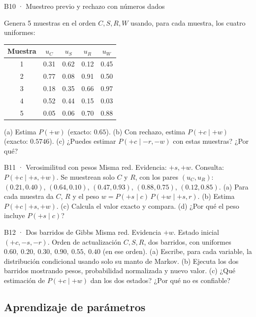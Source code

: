 \begin{ejercicio}{B10 · Muestreo previo y rechazo con números dados }
\begin{center}\figAsp\qquad\tabAsp\end{center}
Genera 5 muestras en el orden $C,S,R,W$ usando, para cada muestra, los cuatro uniformes:
\begin{center}\small
\begin{tabular}{c|cccc}
Muestra & $u_C$ & $u_S$ & $u_R$ & $u_W$\\\hline
1 & 0.31 & 0.62 & 0.12 & 0.45\\
2 & 0.77 & 0.08 & 0.91 & 0.50\\
3 & 0.18 & 0.35 & 0.66 & 0.97\\
4 & 0.52 & 0.44 & 0.15 & 0.03\\
5 & 0.05 & 0.06 & 0.70 & 0.88
\end{tabular}
\end{center}
(a) Estima $P(+w)$ (exacto: $0.65$). (b) Con rechazo, estima $P(+c\mid+w)$ (exacto: $0.5746$).
(c) ¿Puedes estimar $P(+c\mid-r,-w)$ con estas muestras? ¿Por qué?
\end{ejercicio}

\begin{ejercicio}{B11 · Verosimilitud con pesos }
Misma red. Evidencia: $+s,+w$. Consulta: $P(+c\mid+s,+w)$. Se muestrean solo $C$ y $R$, con los pares
$(u_C,u_R)$: $(0.21,0.40)$, $(0.64,0.10)$, $(0.47,0.93)$, $(0.88,0.75)$, $(0.12,0.85)$.
(a) Para cada muestra da $C$, $R$ y el peso $w=P(+s\mid c)\,P(+w\mid+s,r)$.
(b) Estima $P(+c\mid+s,+w)$. (c) Calcula el valor exacto y compara. (d) ¿Por qué el peso incluye $P(+s\mid c)$?
\end{ejercicio}

\begin{ejercicio}{B12 · Dos barridos de Gibbs }
Misma red. Evidencia $+w$. Estado inicial $(+c,-s,-r)$. Orden de actualización $C,S,R$, dos barridos, con uniformes
$0.60,\ 0.20,\ 0.30,\ 0.90,\ 0.55,\ 0.40$ (en ese orden).
(a) Escribe, para cada variable, la distribución condicional usando solo su manto de Markov.
(b) Ejecuta los dos barridos mostrando pesos, probabilidad normalizada y nuevo valor.
(c) ¿Qué estimación de $P(+c\mid+w)$ dan los dos estados? ¿Por qué no es confiable?
\end{ejercicio}

\subsection{Aprendizaje de parámetros}

